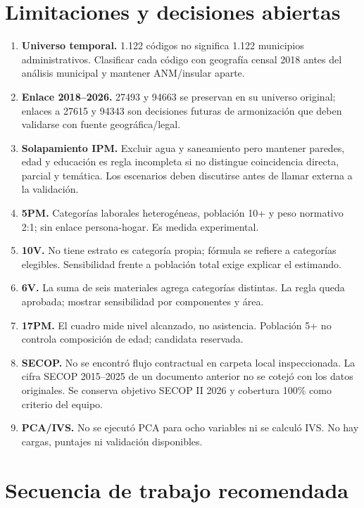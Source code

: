 \documentclass[11pt,a4paper]{article}
\begin{document}
\section{Limitaciones y decisiones abiertas}

\begin{enumerate}[leftmargin=1.2cm]
\item \textbf{Universo temporal.} 1.122 códigos no significa 1.122 municipios administrativos. Clasificar cada código con geografía censal 2018 antes del análisis municipal y mantener ANM/insular aparte.
\item \textbf{Enlace 2018--2026.} 27493 y 94663 se preservan en su universo original; enlaces a 27615 y 94343 son decisiones futuras de armonización que deben validarse con fuente geográfica/legal.
\item \textbf{Solapamiento IPM.} Excluir agua y saneamiento pero mantener paredes, edad y educación es regla incompleta si no distingue coincidencia directa, parcial y temática. Los escenarios deben discutirse antes de llamar externa a la validación.
\item \textbf{5PM.} Categorías laborales heterogéneas, población 10+ y peso normativo 2:1; sin enlace persona-hogar. Es medida experimental.
\item \textbf{10V.} No tiene estrato es categoría propia; fórmula se refiere a categorías elegibles. Sensibilidad frente a población total exige explicar el estimando.
\item \textbf{6V.} La suma de seis materiales agrega categorías distintas. La regla queda aprobada; mostrar sensibilidad por componentes y área.
\item \textbf{17PM.} El cuadro mide nivel alcanzado, no asistencia. Población 5+ no controla composición de edad; candidata reservada.
\item \textbf{SECOP.} No se encontró flujo contractual en carpeta local inspeccionada. La cifra SECOP 2015--2025 de un documento anterior no se cotejó con los datos originales. Se conserva objetivo SECOP II 2026 y cobertura 100\% como criterio del equipo.
\item \textbf{PCA/IVS.} No se ejecutó PCA para ocho variables ni se calculó IVS. No hay cargas, puntajes ni validación disponibles.
\end{enumerate}

\section{Secuencia de trabajo recomendada}
\end{document}

